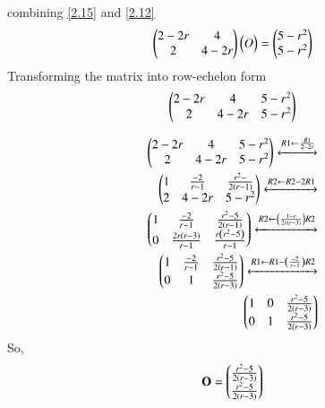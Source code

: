 \documentclass[journal,12pt,twocolumn]{IEEEtran}
\begin{document}
combining \ref{2.15} and \ref{2.12}
%
\begin{align}
\begin{pmatrix}2 - 2r  &  4 \\   2 & 4 - 2r \\\end{pmatrix} \begin{pmatrix}O\end{pmatrix} = \begin{pmatrix}5 - r^2 \\ 5 - r^2 \\\end{pmatrix} \label{2.17}
\end{align}
Transforming the matrix into row-echelon form \\
\begin{align}
\begin{pmatrix}2 - 2r  &  4 &  5 - r^2 \\   2 & 4 - 2r &  5 - r^2 \\\end{pmatrix}  \label{2.18}
\end{align}

	\begin{align}
\myvec{
	2 - 2r & 4 & 5 - r^2 \\
	2 & 4 - 2r & 5 - r^2 \\
}
\xleftrightarrow[]{R1 \leftarrow \frac{R1}{2 - 2r} } \nonumber  \\
%
\myvec{
	1 & \frac{-2}{r-1} & \frac{r^2 - }{2\left( r - 1\right)} \\
	2 & 4 - 2r & 5 - r^2\\
}
\xleftrightarrow[]{R2 \leftarrow  R2 - 2R1 } \nonumber  \\
%
\myvec{
	1 & \frac{-2}{r - 1} & \frac{r^2 - 5}{2 \left( r - 1 \right)} \\
	0 & \frac{2r\left(r - 3 \right) }{ r - 1} & \frac{r \left(r^2 - 5 \right)}{r - 1}
}
\xleftrightarrow[]{R2 \leftarrow \left( \frac{1 - r}{ 2r \left( r - 3\right)}\right)R2 } \nonumber  \\
%	
\myvec{
	1 & \frac{-2}{r - 1} & \frac{r^2 - 5}{2 \left(r - 1\right)} \\
	0 & 1 & \frac{r^2 - 5}{2 \left(r - 3\right)}
}
\xleftrightarrow[]{R1 \leftarrow  R1 - \left( \frac{-2}{r - 1} \right)R2 } \nonumber   \\
\myvec{
	1 & 0 & \frac{r^2 - 5}{2 \left(r - 3\right)} \\
	0 & 1 & \frac{r^2 - 5}{2 \left(r - 3\right)}
}
\end{align}
So,
\begin{align}
\mathbf{O} = \begin{pmatrix} \frac{r^2 - 5}{2 \left(r - 3\right)} \\ \frac{r^2 - 5}{2 \left(r - 3\right)} \\\end{pmatrix} \label{2.19}
\end{align}
\end{document}
